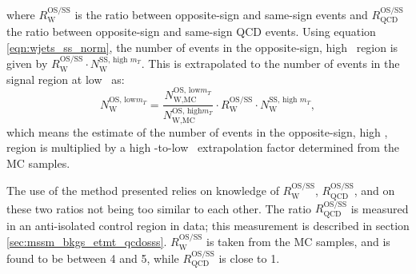 where $R_{\text{W}}^{\text{OS/SS}}$ is the ratio between opposite-sign and same-sign \Wjets events
and $R_{\text{QCD}}^{\text{OS/SS}}$ the ratio between opposite-sign and same-sign QCD events. Using 
equation \ref{eqn:wjets_ss_norm}, the number of \Wjets events in the
opposite-sign, high \mT~region is given by $R_{\text{W}}^{\text{OS/SS}}\cdot N_{\text{W}}^{\text{SS, high } m_{T}}$. 
This is extrapolated to the number of \Wjets events in the signal region at low \mT~as:
\begin{equation}\label{eqn:wjets_os_norm}
N_{\text{W}}^{\text{OS, low} m_{T}} = \frac{N_{\text{W,MC}}^{\text{OS, low} m_{T}}}{N_{\text{W,MC}}^{\text{OS, high} m_{T}}}\cdot R_{\text{W}}^{\text{OS/SS}} \cdot N_{\text{W}}^{\text{SS, high }m_{T}},
\end{equation}
which means the estimate of the number of \Wjets events in the opposite-sign, high \mT, region
is multiplied by a high \mT-to-low \mT~extrapolation factor determined from the \ac{MC} samples.

The use of the method presented relies on knowledge of $R_{\text{W}}^{\text{OS/SS}}$,
$R_{\text{QCD}}^{\text{OS/SS}}$, and on these two ratios not being too similar to each other. 
The ratio $R_{\text{QCD}}^{\text{OS/SS}}$ is measured in an anti-isolated
control region in data; this measurement is described in section \ref{sec:mssm_bkgs_etmt_qcdosss}. $R_{\text{W}}^{\text{OS/SS}}$ is 
taken from the \Wjets \ac{MC} samples, and is found to be between 4 and 5, while $R_{\text{QCD}}^{\text{OS/SS}}$
is close to 1.

